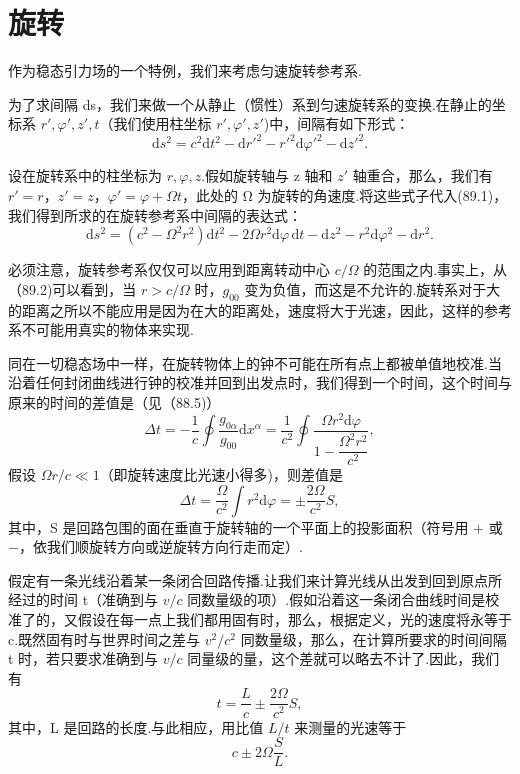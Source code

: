 \section{旋转}

作为稳态引力场的一个特例，我们来考虑匀速旋转参考系.

为了求间隔 ds，我们来做一个从静止（惯性）系到匀速旋转系的变换.在静止的坐标系 $r',\varphi',z',t$（我们使用柱坐标 $r',\varphi',z'$)中，间隔有如下形式：
\begin{equation}
  \mathrm{d}s^2=c^2\mathrm{d}t^2-\mathrm{d}r'^2
  -r'^2\mathrm{d}\varphi'^2-\mathrm{d}z'^2.
\end{equation}

设在旋转系中的柱坐标为 $r,\varphi,z$.假如旋转轴与 z 轴和 $z'$ 轴重合，那么，我们有 $r'=r$，$z'=z$，$\varphi'=\varphi+\varOmega t$，此处的 Ω 为旋转的角速度.将这些式子代入(89.1)，我们得到所求的在旋转参考系中间隔的表达式：
\begin{equation}
  \mathrm{d}s^2=(c^2-\varOmega^2r^2)\mathrm{d}t^2
  -2\varOmega r^2\mathrm{d}\varphi\,\mathrm{d}t
  -\mathrm{d}z^2-r^2\mathrm{d}\varphi^2-\mathrm{d}r^2.
\end{equation}

必须注意，旋转参考系仅仅可以应用到距离转动中心 $c/\varOmega$ 的范围之内.事实上，从（89.2)可以看到，当 $r>c/\varOmega$ 时，$g_{00}$ 变为负值，而这是不允许的.旋转系对于大的距离之所以不能应用是因为在大的距离处，速度将大于光速，因此，这样的参考系不可能用真实的物体来实现.

同在一切稳态场中一样，在旋转物体上的钟不可能在所有点上都被单值地校准.当沿着任何封闭曲线进行钟的校准并回到出发点时，我们得到一个时间，这个时间与原来的时间的差值是（见（88.5)）
\begin{equation*}
  \Delta t=-\frac{1}{c}\oint\frac{g_{0\alpha}}{g_{00}}\mathrm{d}x^{\alpha}
  =\frac{1}{c^2}\oint
  \frac{\varOmega r^2\mathrm{d}\varphi}
  {1-\dfrac{\varOmega^2r^2}{c^2}},
\end{equation*}
假设 $\varOmega r/c\ll1$（即旋转速度比光速小得多)，则差值是
\begin{equation}
  \Delta t=\frac{\varOmega}{c^2}\int r^2\mathrm{d}\varphi
  =\pm\frac{2\varOmega}{c^2}S,
\end{equation}
其中，S 是回路包围的面在垂直于旋转轴的一个平面上的投影面积（符号用 $+$ 或 $-$，依我们顺旋转方向或逆旋转方向行走而定）.

假定有一条光线沿着某一条闭合回路传播.让我们来计算光线从出发到回到原点所经过的时间 t（准确到与 $v/c$ 同数量级的项）.假如沿着这一条闭合曲线时间是校准了的，又假设在每一点上我们都用固有时，那么，根据定义，光的速度将永等于 c.既然固有时与世界时间之差与 $v^2/c^2$ 同数量级，那么，在计算所要求的时间间隔 t 时，若只要求准确到与 $v/c$ 同量级的量，这个差就可以略去不计了.因此，我们有
\begin{equation*}
  t=\frac{L}{c}\pm\frac{2\varOmega}{c^2}S,
\end{equation*}
其中，L 是回路的长度.与此相应，用比值 $L/t$ 来测量的光速等于
\begin{equation}
  c\pm 2\varOmega\frac{S}{L}.
\end{equation}

